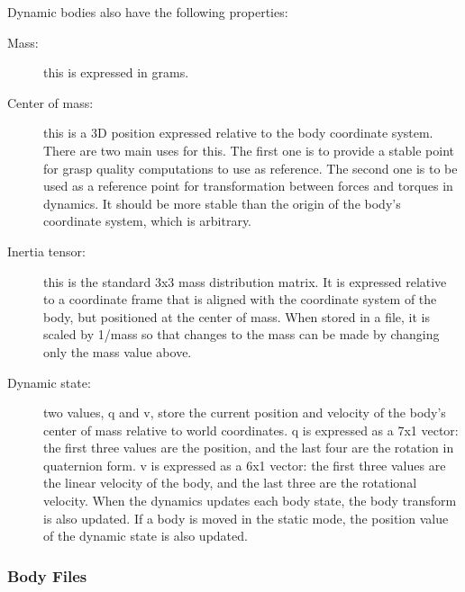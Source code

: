 Dynamic bodies also have the following properties:

\begin{description}
\item[Mass:] this is expressed in grams.
\item[Center of mass:] this is a 3D position expressed relative to the
  body coordinate system. There are two main uses for this. The first
  one is to provide a stable point for grasp quality computations to
  use as reference. The second one is to be used as a reference point
  for transformation between forces and torques in dynamics. It should
  be more stable than the origin of the body's coordinate system,
  which is arbitrary.
\item[Inertia tensor:] this is the standard 3x3 mass distribution
  matrix. It is expressed relative to a coordinate frame that is
  aligned with the coordinate system of the body, but positioned at
  the center of mass. When stored in a file, it is scaled by 1/mass so
  that changes to the mass can be made by changing only the mass value
  above.
\item[Dynamic state:] two values, q and v, store the current position
  and velocity of the body's center of mass relative to world
  coordinates. q is expressed as a 7x1 vector: the first three values
  are the position, and the last four are the rotation in quaternion
  form. v is expressed as a 6x1 vector: the first three values are the
  linear velocity of the body, and the last three are the rotational
  velocity. When the dynamics updates each body state, the body
  transform is also updated. If a body is moved in the static mode,
  the position value of the dynamic state is also updated.
\end{description}

\subsubsection{Body Files}

